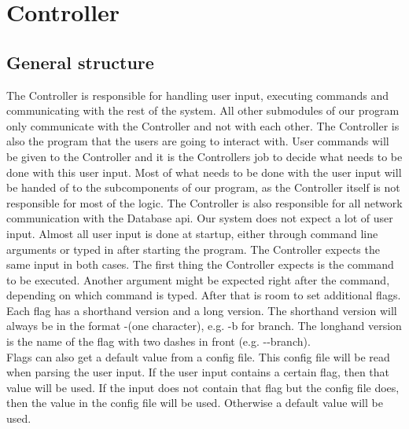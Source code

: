 \documentclass[../Main.tex]{subfiles}
\begin{document}
\section{Controller}

\subsection{General structure}

The Controller is responsible for handling user input, executing commands and communicating with the rest of the system. All other submodules of our program only communicate with the Controller and not with each other. The Controller is also the program that the users are going to interact with. User commands will be given to the Controller and it is the Controllers job to decide what needs to be done with this user input. Most of what needs to be done with the user input will be handed of to the subcomponents of our program, as the Controller itself is not responsible for most of the logic. The Controller is also responsible for all network communication with the Database api.
Our system does not expect a lot of user input. Almost all user input is done at startup, either through command line arguments or typed in after starting the program. The Controller expects the same input in both cases. The first thing the Controller expects is the command to be executed. Another argument might be expected right after the command, depending on which command is typed. After that is room to set additional flags. Each flag has a shorthand version and a long version. The shorthand version will always be in the format -(one character), e.g. -b for branch. The longhand version is the name of the flag with two dashes in front (e.g. -{}-branch).\\
Flags can also get a default value from a config file. This config file will be read when parsing the user input. If the user input contains a certain flag, then that value will be used. If the input does not contain that flag but the config file does, then the value in the config file will be used. Otherwise a default value will be used.
\end{document}
